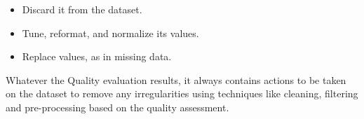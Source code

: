 \begin{itemize}
	\item{
		Discard it from the dataset.
	}
	\item {
		Tune, reformat, and normalize its values.
	}
	\item {
		Replace values, as in missing data.
	}
\end{itemize}

Whatever the Quality evaluation results, it always contains
actions to be taken on the dataset to remove any irregularities using techniques like cleaning, filtering and pre-processing based on the quality assessment.